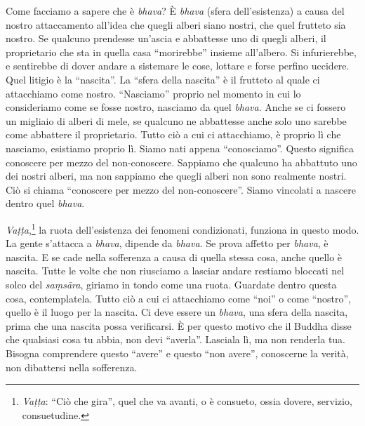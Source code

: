 Come facciamo a sapere che è \emph{bhava}? È \emph{bhava} (sfera
dell'esistenza) a causa del nostro attaccamento all'idea che quegli
alberi siano nostri, che quel frutteto sia nostro. Se qualcuno prendesse
un'ascia e abbattesse uno di quegli alberi, il proprietario che sta in
quella casa ``morirebbe'' insieme all'albero. Si infurierebbe, e
sentirebbe di dover andare a sistemare le cose, lottare e forse perfino
uccidere. Quel litigio è la ``nascita''. La ``sfera della nascita'' è il
frutteto al quale ci attacchiamo come nostro. ``Nasciamo'' proprio nel
momento in cui lo consideriamo come se fosse nostro, nasciamo da quel
\emph{bhava}. Anche se ci fossero un migliaio di alberi di mele, se
qualcuno ne abbattesse anche solo uno sarebbe come abbattere il
proprietario. Tutto ciò a cui ci attacchiamo, è proprio lì che nasciamo,
esistiamo proprio lì. Siamo nati appena ``conosciamo''. Questo significa
conoscere per mezzo del non-conoscere. Sappiamo che qualcuno ha
abbattuto uno dei nostri alberi, ma non sappiamo che quegli alberi non
sono realmente nostri. Ciò si chiama ``conoscere per mezzo del
non-conoscere''. Siamo vincolati a nascere dentro quel \emph{bhava}.

\emph{Vaṭṭa},\footnote{\emph{Vaṭṭa}: ``Ciò che gira'', quel che va avanti, o è consueto,
  ossia dovere, servizio, consuetudine.}
la ruota dell'esistenza dei fenomeni condizionati,
funziona in questo modo. La gente s'attacca a \emph{bhava}, dipende da
\emph{bhava}. Se prova affetto per \emph{bhava}, è nascita. E se cade
nella sofferenza a causa di quella stessa cosa, anche quello è nascita.
Tutte le volte che non riusciamo a lasciar andare restiamo bloccati nel
solco del \emph{saṃsāra}, giriamo in tondo come una ruota. Guardate
dentro questa cosa, contemplatela. Tutto ciò a cui ci attacchiamo come
``noi'' o come ``nostro'', quello è il luogo per la nascita. Ci deve
essere un \emph{bhava}, una sfera della nascita, prima che una nascita
possa verificarsi. È per questo motivo che il Buddha disse che qualsiasi
cosa tu abbia, non devi ``averla''. Lasciala lì, ma non renderla tua.
Bisogna comprendere questo ``avere'' e questo ``non avere'', conoscerne
la verità, non dibattersi nella sofferenza.

